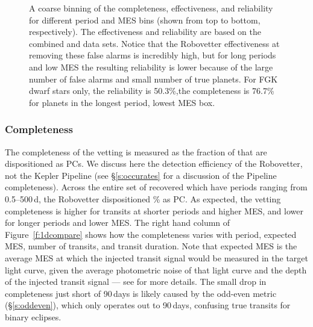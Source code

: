 \begin{figure}[hp]
\begin{center}
\begin{tabular}{c}
\end{tabular}
\caption{A coarse binning of the completeness, effectiveness, and reliability for different period and MES bins (shown from top to bottom, respectively). The effectiveness and reliability are based on the combined \invtce{} and \scrtce{} data sets. Notice that the Robovetter effectiveness at removing these false alarms is incredibly high, but for long periods and low MES the resulting reliability is lower because of the large number of false alarms and small number of true planets. For FGK dwarf stars only, the reliability is 50.3\%,the completeness is 76.7\% for planets in the longest period, lowest MES box. }
\label{f:scoregrid}
\end{center}
\end{figure}



\subsubsection{Completeness}
\label{s:comp}
The completeness of the vetting is measured as the fraction of  that are dispositioned as PCs. We discuss here the detection efficiency of the Robovetter, not the Kepler Pipeline (see \S\ref{s:occurates} for a discussion of the Pipeline completeness). Across the entire set of recovered  which have periods ranging from 0.5--500\,d, the Robovetter dispositioned \completeness{}\% as PC. As expected, the vetting completeness is higher for transits at shorter periods and higher MES, and lower for longer periods and lower MES. The right hand column of Figure~\ref{f:1dcompare} shows how the completeness varies with period, expected MES, number of transits, and transit duration. Note that expected MES is the average MES at which the injected transit signal would be measured in the target light curve, given the average photometric noise of that light curve and the depth of the injected transit signal --- see \citealt{Christiansen2017} for more details. The small drop in completeness just short of 90\,days is likely caused by the odd-even metric (\S\ref{s:oddeven}), which only operates out to 90\,days, confusing true transits for binary eclipses.  


